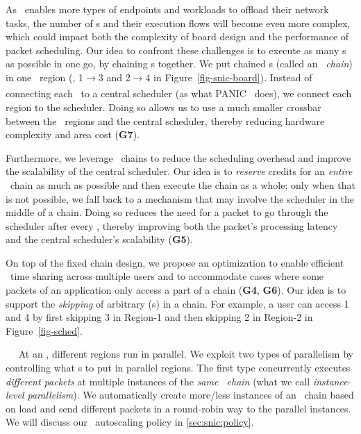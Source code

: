 As \snic\ enables more types of endpoints and workloads to offload their network tasks, the number of \nt{}s and their execution flows will become even more complex, which could impact both the complexity of board design and the performance of packet scheduling.
Our idea to confront these challenges is to execute as many \nt{}s as possible in one go, by chaining \nt{}s together.
We put chained \nt{}s (called an {\em \nt\ chain}) in one \nt\ region (\eg, \nt{}1$\xrightarrow[]{}$\nt{}3 and \nt{}2$\xrightarrow[]{}$\nt{}4 in Figure~\ref{fig-snic-board}).
Instead of connecting each \nt\ to a central scheduler (as what PANIC~\cite{panic-osdi20} does), we connect each region to the scheduler.
Doing so allows us to use a much smaller crossbar between the \nt\ regions and the central scheduler, thereby reducing hardware complexity and area cost (\textbf{G7}).



Furthermore, we leverage \nt\ chains to reduce the scheduling overhead and improve the scalability of the central scheduler.
Our idea is to {\em reserve} credits for an {\em entire} \nt\ chain as much as possible and then execute the chain as a whole; only when that is not possible, we fall back to a mechanism that may involve the scheduler in the middle of a chain. 
Doing so reduces the need for a packet to go through the scheduler after every \nt, thereby improving both the packet's processing latency and the central scheduler's scalability (\textbf{G5}).

On top of the fixed chain design, we propose an optimization to enable efficient \nt\ time sharing across multiple users and to accommodate cases where some packets of an application only access a part of a chain (\textbf{G4}, \textbf{G6}).
Our idea is to support the {\em skipping} of arbitrary \nt(s) in a chain.
For example, a user can access \nt{}1 and \nt{}4 by first skipping \nt{}3 in Region-1 and then skipping \nt{}2 in Region-2 in Figure~\ref{fig-sched}.


~~
At an \snic, different regions run in parallel.
We exploit two types of parallelism by controlling what \nt{}s to put in parallel regions.
The first type concurrently executes {\em different packets} at multiple instances of the {\em same \nt\ chain} (what we call {\em instance-level parallelism}).
We automatically create more/less instances of an \nt\ chain based on load and send different packets in a round-robin way to the parallel instances.
We will discuss our \nt\ autoscaling policy in \ref{sec:snic:policy}.


